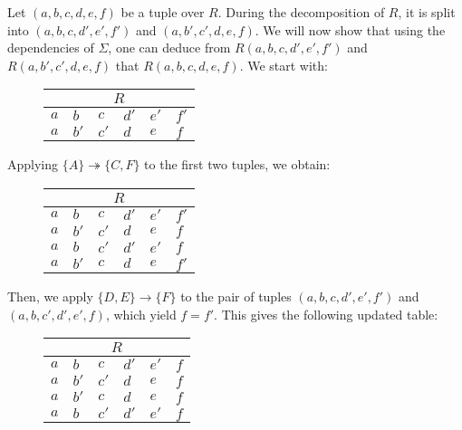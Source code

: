 \documentclass{../../cs-classes/cs-classes}
\begin{document}
\begin{exercise}
    Let $(a, b, c, d, e, f)$ be a tuple over $R$. During the decomposition of $R$,
    it is split into $(a, b, c, d', e', f')$ and $(a, b', c', d, e, f)$.
    We will now show that using the dependencies of $\Sigma$, one can deduce
    from $R(a, b, c, d', e', f')$ and $R(a, b', c', d, e, f)$ that $R(a, b, c, d, e, f)$.
    We start with:
    \begin{figure}[H]
        \centering
        \begin{tabular}{l l l l l l}
            \multicolumn{6}{c}{$R$}                \\
            \midrule
            $a$ & $b$  & $c$  & $d'$ & $e'$ & $f'$ \\
            $a$ & $b'$ & $c'$ & $d$  & $e$  & $f$
        \end{tabular}
    \end{figure}
    Applying $\{A\} \twoheadrightarrow \{C, F\}$ to the first two tuples, we obtain:
    \begin{figure}[H]
        \centering
        \begin{tabular}{l l l l l l}
            \multicolumn{6}{c}{$R$}                \\
            \midrule
            $a$ & $b$  & $c$  & $d'$ & $e'$ & $f'$ \\
            $a$ & $b'$ & $c'$ & $d$  & $e$  & $f$  \\
            $a$ & $b$  & $c'$ & $d'$ & $e'$ & $f$  \\
            $a$ & $b'$ & $c$  & $d$  & $e$  & $f'$
        \end{tabular}
    \end{figure}
    Then, we apply $\{D, E\} \rightarrow \{F\}$ to the pair of tuples $(a, b, c, d', e', f')$
    and $(a, b, c', d', e', f)$, which yield $f = f'$. This gives the following updated table:
    \begin{figure}[H]
        \centering
        \begin{tabular}{l l l l l l}
            \multicolumn{6}{c}{$R$}               \\
            \midrule
            $a$ & $b$  & $c$  & $d'$ & $e'$ & $f$ \\
            $a$ & $b'$ & $c'$ & $d$  & $e$  & $f$ \\
            $a$ & $b'$ & $c$  & $d$  & $e$  & $f$ \\
            $a$ & $b$  & $c'$ & $d'$ & $e'$ & $f$
        \end{tabular}
    \end{figure}

\end{exercise}
\end{document}
